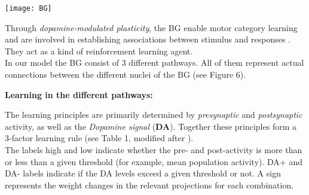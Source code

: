 \documentclass[portrait,final,a0paper,fontscale=0.33]{baposter}
\begin{document}
\begin{poster}
{\begin{adjustbox}{minipage=0.95\textwidth, margin=5pt, center}
\begin{minipage}[l]{0.48\textwidth}
			\vspace{5pt}
			\begin{flushright}
				\texttt{[image: BG]}
			\end{flushright}

			
			\vspace{25pt}
			\justifying
			
			Through \textit{dopamine-modulated plasticity}, the BG enable motor category learning \parencite{segerHowBasalGanglia2008a} and are involved in establishing associations between stimulus and responses \parencite{packardLearningMemoryFunctions2002a}. They act as a kind of reinforcement learning agent. \\
			In our model the BG consist of 3 different pathways. All of them represent actual connections between the different nuclei of the BG (see Figure 6).
			
			\vspace{10pt}
			
		\end{minipage}
		\hfill
		\begin{minipage}[r]{0.49\textwidth}
			\textbf{Learning in the different pathways:}\\
			\justifying
			
			The learning principles are primarily determined by \textit{presynaptic} and \textit{postsynaptic} activity, as well as the \textit{Dopamine signal} (\textbf{DA}). Together these principles form a 3-factor learning rule (see Table 1, modified after \cite{maithOptimalAttentionTuning2021c}). \\
			The labels high and low indicate whether the pre- and post-activity is more than or less than a given threshold (for example, mean population activity).
			DA+ and DA- labels indicate if the DA levels exceed a given threshold or not. A sign represents the weight changes in the relevant projections for each combination.
			
			\vspace{10pt}
			
			
		\end{minipage}
	\end{adjustbox}

}

\end{poster}
\end{document}

